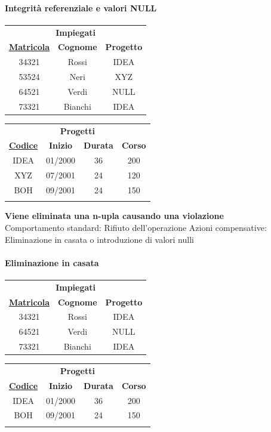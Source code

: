 \documentclass[12pt,a4paper]{article}
\begin{document}
\paragraph{Integrità referenziale e valori NULL}
\begin{center}
\begin{tabular}{ccc}
\multicolumn{3}{c}{\textbf{Impiegati}} \\
\underline{\textbf{Matricola}} & \textbf{Cognome} & \textbf{Progetto} \\ \hline
34321 & Rossi & IDEA \\
53524 & Neri & XYZ \\
64521 & Verdi & NULL \\ 
73321 & Bianchi & IDEA\\ \hline
\end{tabular} \Sep \Sep
\begin{tabular}{cccc}
\multicolumn{4}{c}{\textbf{Progetti}} \\
\underline{\textbf{Codice}} & \textbf{Inizio} & \textbf{Durata} & \textbf{Corso} \\ \hline
IDEA & 01/2000 & 36 & 200 \\
XYZ & 07/2001 & 24 & 120 \\
BOH & 09/2001 & 24 & 150 \\
 &  &  & \\ \hline
\end{tabular}
\end{center}
\textbf{Viene eliminata una n-upla causando una violazione}\\
Comportamento standard: Rifiuto dell'operazione
Azioni compensative: Eliminazione in casata o introduzione di valori nulli

\paragraph{Eliminazione in casata}
\begin{center}
\begin{tabular}{ccc}
\multicolumn{3}{c}{\textbf{Impiegati}} \\
\underline{\textbf{Matricola}} & \textbf{Cognome} & \textbf{Progetto} \\ \hline
34321 & Rossi & IDEA \\
64521 & Verdi & NULL \\ 
73321 & Bianchi & IDEA\\ \hline
\end{tabular} \Sep \Sep
\begin{tabular}{cccc}
\multicolumn{4}{c}{\textbf{Progetti}} \\
\underline{\textbf{Codice}} & \textbf{Inizio} & \textbf{Durata} & \textbf{Corso} \\ \hline
IDEA & 01/2000 & 36 & 200 \\
BOH & 09/2001 & 24 & 150 \\
 &  &  & \\ \hline
\end{tabular}
\end{center}
\end{document}
